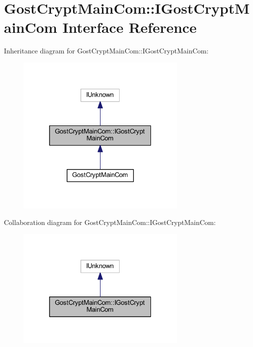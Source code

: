 \hypertarget{interface_gost_crypt_main_com_1_1_i_gost_crypt_main_com}{}\section{Gost\+Crypt\+Main\+Com\+:\+:I\+Gost\+Crypt\+Main\+Com Interface Reference}
\label{interface_gost_crypt_main_com_1_1_i_gost_crypt_main_com}


Inheritance diagram for Gost\+Crypt\+Main\+Com\+:\+:I\+Gost\+Crypt\+Main\+Com\+:
\nopagebreak
\begin{figure}[H]
\begin{center}
\leavevmode
\includegraphics[width=235pt]{interface_gost_crypt_main_com_1_1_i_gost_crypt_main_com__inherit__graph}
\end{center}
\end{figure}


Collaboration diagram for Gost\+Crypt\+Main\+Com\+:\+:I\+Gost\+Crypt\+Main\+Com\+:
\nopagebreak
\begin{figure}[H]
\begin{center}
\leavevmode
\includegraphics[width=235pt]{interface_gost_crypt_main_com_1_1_i_gost_crypt_main_com__coll__graph}
\end{center}
\end{figure}
